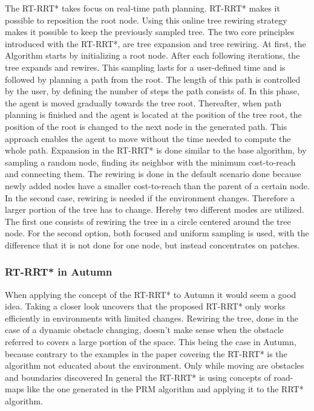 The RT-RRT* takes focus on real-time path planning. RT-RRT* makes it possible to reposition the root node. Using this online tree rewiring strategy makes it possible to keep the previously sampled tree.
The two core principles introduced with the RT-RRT*, are tree expansion and tree rewiring. 
At first, the Algorithm starts by initializing a root node. After each following iterations, the tree expands and rewires. This sampling lasts for a user-defined time and is followed by planning a path from the root. The length of this path is controlled by the user, by defining the number of steps the path consists of. In this phase, the agent is moved gradually towards the tree root. Thereafter, when path planning is finished and the agent is located at the position of the tree root, the position of the root is changed to the next node in the generated path. This approach enables the agent to move without the time needed to compute the whole path.
Expansion in the RT-RRT* is done similar to the base algorithm, by sampling a random node, finding its neighbor with the minimum cost-to-reach and connecting them.
The rewiring is done in the default scenario done because newly added nodes have a smaller cost-to-reach than the parent of a certain node. In the second case, rewiring is needed if the environment changes. Therefore a larger portion of the tree has to change. Hereby two different modes are utilized. The first one consists of rewiring the tree in a circle centered around the tree node. For the second option, both focused and uniform sampling is used, with the difference that it is not done for one node, but instead concentrates on patches.

\subsubsection{RT-RRT* in Autumn}

When applying the concept of the RT-RRT* to Autumn it would seem a good idea. Taking a closer look uncovers that the proposed RT-RRT* only works efficiently in environments with limited changes. Rewiring the tree, done in the case of a dynamic obstacle changing, doesn't make sense when the obstacle referred to covers a large portion of the space. This being the case in Autumn, because contrary to the examples in the paper covering the RT-RRT* is the algorithm not educated about the environment. Only while moving are obstacles and boundaries discovered In general the RT-RRT* is using concepts of road-maps like the one generated in the PRM algorithm and applying it to the RRT* algorithm.  

